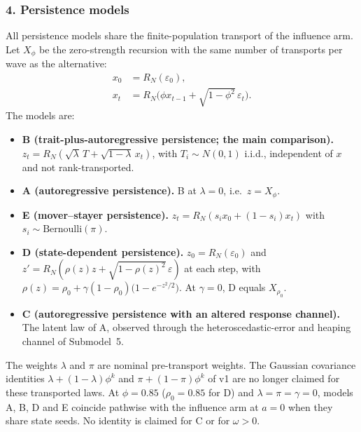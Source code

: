 \subsubsection*{4. Persistence models}
All persistence models share the finite-population transport of the influence arm. Let $X_\phi$ be the zero-strength recursion with the same number of transports per wave as the alternative:
\begin{align*}
x_0&=R_N(\varepsilon_0),\\
x_t&=R_N\bigl(\phi x_{t-1}+\sqrt{1-\phi^2}\,\varepsilon_t\bigr).
\end{align*}
The models are:
\begin{itemize}
\item \textbf{B (trait-plus-autoregressive persistence; the main comparison).} $z_t=R_N(\sqrt\lambda\,T+\sqrt{1-\lambda}\,x_t)$, with $T_i\sim N(0,1)$ i.i.d., independent of $x$ and not rank-transported.
\item \textbf{A (autoregressive persistence).} B at $\lambda=0$, i.e.\ $z=X_\phi$.
\item \textbf{E (mover--stayer persistence).} $z_t=R_N(s_i x_0+(1-s_i)x_t)$ with $s_i\sim\mathrm{Bernoulli}(\pi)$.
\item \textbf{D (state-dependent persistence).} $z_0=R_N(\varepsilon_0)$ and $z'=R_N(\rho(z)z+\sqrt{1-\rho(z)^2}\,\varepsilon)$ at each step, with $\rho(z)=\rho_0+\gamma(1-\rho_0)\bigl(1-e^{-z^2/2}\bigr)$. At $\gamma=0$, D equals $X_{\rho_0}$.
\item \textbf{C (autoregressive persistence with an altered response channel).} The latent law of A, observed through the heteroscedastic-error and heaping channel of Submodel~5.
\end{itemize}
The weights $\lambda$ and $\pi$ are nominal pre-transport weights. The Gaussian covariance identities $\lambda+(1-\lambda)\phi^k$ and $\pi+(1-\pi)\phi^k$ of v1 are no longer claimed for these transported laws. At $\phi=0.85$ ($\rho_0=0.85$ for D) and $\lambda=\pi=\gamma=0$, models A, B, D and E coincide pathwise with the influence arm at $a=0$ when they share state seeds. No identity is claimed for C or for $\omega>0$.

